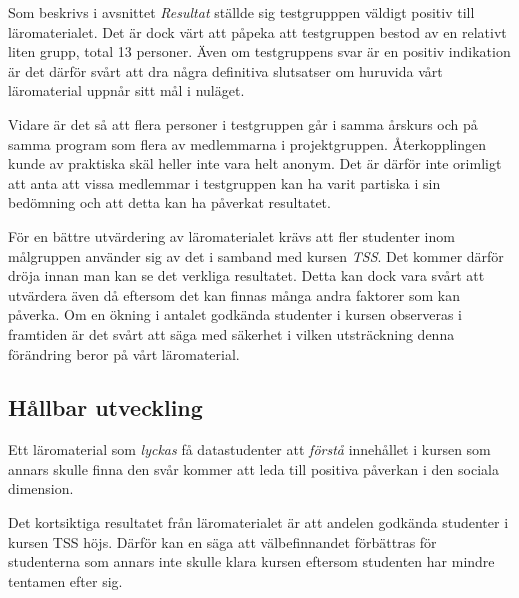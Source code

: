 \documentclass[]{article}
\begin{document}
Som beskrivs i avsnittet \textit{Resultat} ställde sig testgrupppen
väldigt positiv till läromaterialet. Det är dock värt att påpeka att
testgruppen bestod av en relativt liten grupp, total 13 personer.
Även om testgruppens svar är en positiv indikation är det därför svårt
att dra några definitiva slutsatser om huruvida vårt läromaterial
uppnår sitt mål i nuläget.

Vidare är det så att flera personer i testgruppen går i samma årskurs
och på samma program som flera av medlemmarna i
projektgruppen. Återkopplingen kunde av praktiska skäl heller inte
vara helt anonym. Det är därför inte orimligt att anta att vissa
medlemmar i testgruppen kan ha varit partiska i sin bedömning och att
detta kan ha påverkat resultatet.

För en bättre utvärdering av läromaterialet krävs att fler studenter
inom målgruppen använder sig av det i samband med kursen
\textit{TSS}. Det kommer därför dröja innan man kan se det verkliga
resultatet. Detta kan dock vara svårt att utvärdera även då eftersom
det kan finnas många andra faktorer som kan påverka. Om en ökning i
antalet godkända studenter i kursen observeras i framtiden är det
svårt att säga med säkerhet i vilken utsträckning denna förändring
beror på vårt läromaterial.


\subsection{Hållbar utveckling}

Ett läromaterial som \emph{lyckas} få datastudenter att \emph{förstå}
innehållet i kursen som annars skulle finna den svår kommer att leda
till positiva påverkan i den sociala dimension. %

Det kortsiktiga resultatet från läromaterialet är att andelen godkända
studenter i kursen TSS höjs. Därför kan en säga att välbefinnandet
förbättras för studenterna som annars inte skulle klara kursen eftersom
studenten har mindre tentamen efter sig.
\end{document}
